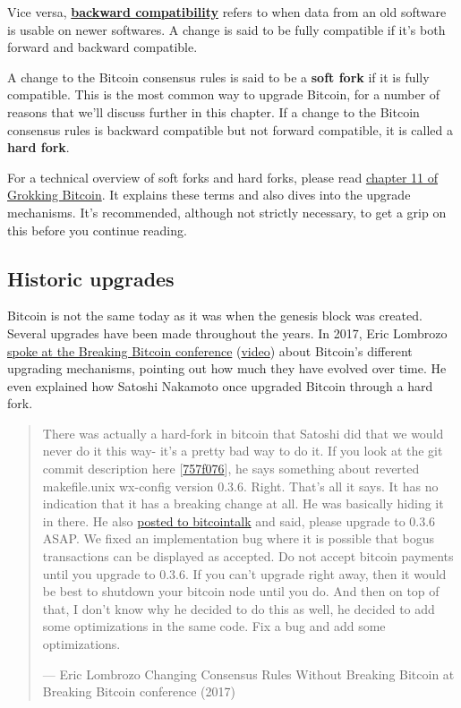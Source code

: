 Vice versa,
\href{https://en.wikipedia.org/wiki/Backward_compatibility}{\textbf{backward
compatibility}} refers to when data from an old software is usable on
newer softwares. A change is said to be fully compatible if it's both
forward and backward compatible.

A change to the Bitcoin consensus rules is said to be a \textbf{soft
fork} if it is fully compatible. This is the most common way to upgrade
Bitcoin, for a number of reasons that we'll discuss further in this
chapter. If a change to the Bitcoin consensus rules is backward
compatible but not forward compatible, it is called a \textbf{hard
fork}.

For a technical overview of soft forks and hard forks, please read
\href{https://rosenbaum.se/book/grokking-bitcoin-11.html}{chapter 11 of
Grokking Bitcoin}. It explains these terms and also dives into the
upgrade mechanisms. It's recommended, although not strictly necessary,
to get a grip on this before you continue reading.

\hypertarget{historic-upgrades}{%
\subsection{Historic upgrades}\label{historic-upgrades}}

Bitcoin is not the same today as it was when the genesis block was
created. Several upgrades have been made throughout the years. In 2017,
Eric Lombrozo
\href{https://btctranscripts.com/breaking-bitcoin/2017/changing-consensus-rules-without-breaking-bitcoin/}{spoke
at the Breaking Bitcoin conference}
(\href{https://www.youtube.com/watch?v=0WCaoGiAOHE\&t=1926s}{video})
about Bitcoin's different upgrading mechanisms, pointing out how much
they have evolved over time. He even explained how Satoshi Nakamoto once
upgraded Bitcoin through a hard fork.

\begin{quote}
There was actually a hard-fork in bitcoin that Satoshi did that we would
never do it this way- it's a pretty bad way to do it. If you look at the
git commit description here
{[}\href{https://github.com/bitcoin/bitcoin/commit/757f0769d8360ea043f469f3a35f6ec204740446}{757f076}{]},
he says something about reverted makefile.unix wx-config version 0.3.6.
Right. That's all it says. It has no indication that it has a breaking
change at all. He was basically hiding it in there. He also
\href{https://bitcointalk.org/index.php?topic=626.msg6451\#msg6451}{posted
to bitcointalk} and said, please upgrade to 0.3.6 ASAP. We fixed an
implementation bug where it is possible that bogus transactions can be
displayed as accepted. Do not accept bitcoin payments until you upgrade
to 0.3.6. If you can't upgrade right away, then it would be best to
shutdown your bitcoin node until you do. And then on top of that, I
don't know why he decided to do this as well, he decided to add some
optimizations in the same code. Fix a bug and add some optimizations.

---  Eric Lombrozo Changing Consensus Rules Without Breaking Bitcoin at
Breaking Bitcoin conference (2017)
\end{quote}


